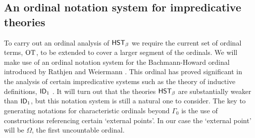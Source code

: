 \documentclass[UKenglish,cleveref,DIV=12]{scrartcl}
\theoremstyle{definition}
\theoremstyle{definition}
\begin{document}
\subsection{An ordinal notation system for impredicative theories} \label{extsec:moreordinals}
To carry out an ordinal analysis of $\mathsf{HST}_\beta$ we require the current
set of ordinal terms, $\mathrm{OT}$, to be extended to cover a larger segment of the
ordinals. We will make use of an ordinal notation system for the Bachmann-Howard
ordinal introduced by Rathjen and Weiermann \cite{RW93}. This
ordinal has proved significant in
the analysis of certain impredicative systems such as the theory of inductive
definitions, $\mathsf{ID}_1$ \cite{BFPS81}. It will turn out that the theories $\mathsf{HST}_\beta$ are
substantially weaker than $\mathsf{ID}_1$, but this notation system is still a
natural one to consider. The key to generating notations for characteristic
ordinals beyond $\Gamma_0$ is the use of constructions referencing certain
`external points'. In our case the `external point' will be $\Omega$, the first
uncountable ordinal.
\end{document}
